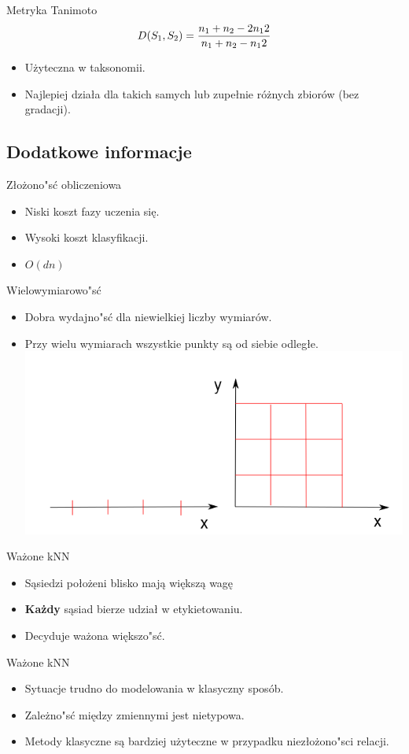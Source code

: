 \begin{frame}{Metryka Tanimoto}
\begin{equation}
	\centering
	D(S_1,S_2) = \frac{n_1 + n_2 - 2n_12}{n_1 + n_2 - n_12}
\end{equation}
\begin{itemize}
	\item Użyteczna w taksonomii.
	\item Najlepiej działa dla takich samych lub zupełnie różnych zbiorów (bez gradacji).
\end{itemize}
\end{frame}

\subsection{Dodatkowe informacje}
\begin{frame}{Złożono"sć obliczeniowa}
\begin{itemize}
	\item Niski koszt fazy uczenia się.
	\item Wysoki koszt klasyfikacji.
	\item $O(dn)$
\end{itemize}
\end{frame}

\begin{frame}{Wielowymiarowo"sć}
\begin{itemize}
	\item Dobra wydajno"sć dla niewielkiej liczby wymiarów.
	\item Przy wielu wymiarach wszystkie punkty są od siebie odległe.
	\includegraphics[keepaspectratio=true, scale=0.55]{dims_small}
\end{itemize}
\end{frame}

\begin{frame}{Ważone kNN}
\begin{itemize}
	\item Sąsiedzi położeni blisko mają większą wagę
	\item \textbf{Każdy} sąsiad bierze udział w etykietowaniu.
	\item Decyduje ważona większo"sć.
\end{itemize}
\end{frame}


\begin{frame}{Ważone kNN}
\begin{itemize}
	\item Sytuacje trudno do modelowania w klasyczny sposób.
	\item Zależno"sć między zmiennymi jest nietypowa.
	\item Metody klasyczne są bardziej użyteczne w przypadku niezłożono"sci relacji.
\end{itemize}
\end{frame}



